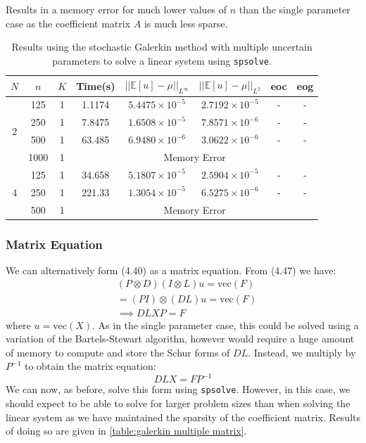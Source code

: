 \documentclass[11pt]{article}
\numberwithin{equation}{section}
\begin{document}
Results in a memory error for much lower values of $n$ than the single parameter case as the coefficient matrix $A$ is much less sparse.

\begin{table}[H]
\centering
\begin{tabular}{|c|c|c|c|c|c|c|c|}
\hline
$N$ & $n$ & $K$ & Time(s) & $|| \mathbb{E}[u] - \mu ||_{L^{\infty}}$ & $|| \mathbb{E}[u] - \mu ||_{L^{2}}$ & eoc & eog \\
\hline
\multirow{4}{*}{2} & 125 & 1 & 1.1174 & $5.4475 \times 10^{-5}$ & $2.7192 \times 10^{-5}$ & - & - \\
& 250 & 1 & 7.8475 & $1.6508 \times 10^{-5}$ & $7.8571 \times 10^{-6}$ & - & - \\
& 500 & 1 & 63.485 & $6.9480 \times 10^{-6}$ & $3.0622 \times 10^{-6}$  & - & - \\
\cline{4-8}
& 1000 & 1 & \multicolumn{5}{c|}{Memory Error} \\
\hline
\multirow{4}{*}{4} & 125 & 1 & 34.658 & $5.1807 \times 10^{-5}$ & $2.5904 \times 10^{-5}$ & - & - \\
& 250 & 1 & 221.33 & $1.3054 \times 10^{-5}$ & $6.5275 \times 10^{-6}$ & - & - \\
\cline{4-8}
& 500 & 1 & \multicolumn{5}{c|}{Memory Error} \\
\hline
\end{tabular}
\captionsetup{justification=centering}
\caption{Results using the stochastic Galerkin method with multiple uncertain parameters to solve a linear system using \texttt{spsolve}.}
\label{table:galerkin multiple linear}
\end{table}

\subsubsection{Matrix Equation}
We can alternatively form (4.40) as a matrix equation. From (4.47) we have:
\begin{equation}
\begin{split}
& (P \otimes D)(I \otimes L) u = \text{vec}(F) \\
& = (PI) \otimes (DL) u = \text{vec}(F) \\
& \implies DL X P = F 
\end{split}
\end{equation}
where $u = \text{vec}(X)$. As in the single parameter case, this could be solved using a variation of the Bartels-Stewart algorithn, however would require a huge amount of memory to compute and store the Schur forms of $DL$. Instead, we multiply by $P^{-1}$ to obtain the matrix equation:
\begin{equation}
DL X = F P^{-1}
\end{equation}
We can now, as before, solve this form using \texttt{spsolve}. However, in this case, we should expect to be able to solve for larger problem sizes than when solving the linear system as we have maintained the sparsity of the coefficient matrix. Results of doing so are given in \ref{table:galerkin multiple matrix}.
\end{document}
